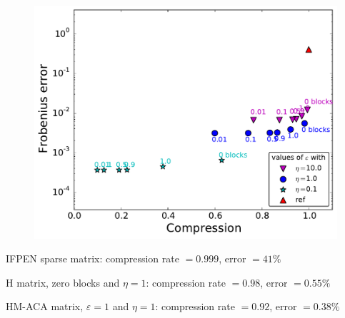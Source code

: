\begin{frame}
\begin{figure}
\begin{minipage}[c]{.6\linewidth}
\includegraphics[width=\textwidth]{../images/graphe_compasparse_output_compression_18_08_2016matrice5364FracsTriangles.pdf}
\end{minipage}
\end{figure}

\vspace{-5pt}
{\footnotesize
IFPEN sparse matrix: compression rate  \alert{$=0.999$}, error \alert{$=41\%$}

H matrix, zero blocks and $\eta=1$: compression rate $=0.98$, error $=0.55\%$

HM-ACA matrix, $\varepsilon=1$ and $\eta=1$: compression rate  \alert{$=0.92$}, error \alert{$=0.38\%$}
}

\end{frame}


